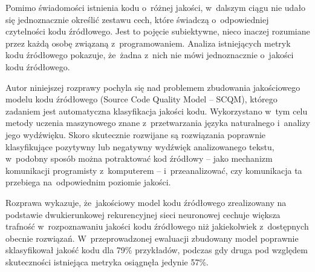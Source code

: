 \documentclass[twoside]{praca}
\begin{document}

Pomimo świadomości istnienia kodu o~różnej jakości, w~dalszym ciągu nie udało się jednoznacznie określić zestawu cech, które świadczą o~odpowiedniej czytelności kodu źródłowego. Jest to pojęcie subiektywne, nieco inaczej rozumiane przez każdą osobę związaną z~programowaniem. Analiza istniejących metryk kodu źródłowego pokazuje, że~żadna z~nich nie mówi jednoznacznie o~jakości kodu źródłowego.


Autor niniejszej rozprawy pochyla się nad problemem zbudowania jakościowego modelu kodu źródłowego (Source Code Quality Model -- SCQM), którego zadaniem jest automatyczna klasyfikacja jakości kodu.
Wykorzystano w~tym celu metody uczenia maszynowego znane z~przetwarzania języka naturalnego i~analizy jego wydźwięku. Skoro skutecznie rozwijane są rozwiązania poprawnie klasyfikujące pozytywny lub negatywny wydźwięk analizowanego tekstu, w~podobny sposób można potraktować kod źródłowy -- jako mechanizm komunikacji programisty z~komputerem -- i~przeanalizować, czy komunikacja ta przebiega na~odpowiednim poziomie jakości.

Rozprawa wykazuje, że~jakościowy model kodu źródłowego zrealizowany na podstawie dwukierunkowej rekurencyjnej sieci neuronowej cechuje większa trafność w~rozpoznawaniu jakości kodu źródłowego niż jakiekolwiek z~dostępnych obecnie rozwiązań. W~przeprowadzonej ewaluacji zbudowany model poprawnie sklasyfikował jakość kodu dla 79\% przykładów, podczas gdy druga pod względem skuteczności istniejąca metryka osiągnęła jedynie 57\%.
\end{document}
